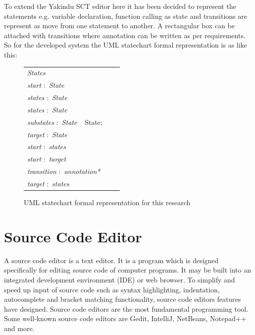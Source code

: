 To extend the Yakindu SCT editor here it has been decided to represent the statements e.g. variable declaration, function calling as state and transitions are represent as move from one statement to another. A rectangular box can be attached with transitions where annotation can be written as per requirements. So for the developed system the UML statechart formal representation is as like this: 
\begin{figure}[ht!]
	\centering
	\begin{tabular}{lll}
	\footnotesize                       
	\textit{States}          \\
	\footnotesize                       
	\textit{start}          
	$:$  \textit{State}\\
	
	\textit{states}          
	$:$  \textit{State}\\
	
	\textit{states}           
	$:$  \textit{State}\\
	\footnotesize
	\textit{substates}            $:$         \textit{State} $\ \  $ {State};       \\   
	\footnotesize
	\textit{target}             $:$         \textit{State}    \\
	\footnotesize                       
	\textit{start}           
	$:$  \textit{states}\\
	\footnotesize                       
	\textit{start}          
	$:$ \textit{target}\\
	\footnotesize                       
	\textit{transition}          
	$:$ \textit{annotation*}\\
	\footnotesize                       
	\textit{target} $:$ \textit{states}        \\ 	
	\end{tabular}
	\vspace{1em}
	\caption{UML statechart formal representation for this research}
	\label{statechart_formal_representation_for _this_system}
	\end{figure}
	
\section{Source Code Editor}

A source code editor is a text editor. It is a program which is designed specifically for editing source code of computer programs. It may be built into an integrated development environment (IDE) or web browser. To simplify and speed up input of source code such as syntax highlighting, indentation, autocomplete and bracket matching functionality, source code editors features have designed. Source code editors are the most fundamental programming tool. Some well-known source code editors are Gedit, IntelliJ, NetBeans, Notepad++ and more.

